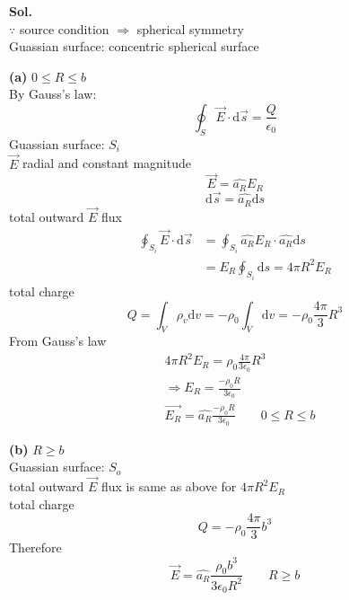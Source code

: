\documentclass[12pt, a4paper]{article}
\begin{document}
\textbf{Sol.} \\
$\because$ source condition $\Rightarrow$ spherical symmetry \\
Guassian surface: concentric spherical surface \\
\newpage

\textbf{(a)} $0 \leq R \leq b$ \\
By Gauss's law:
$$
\oint_S \vec{E} \cdot \text{d} \vec{s} = \frac{Q}{\epsilon_0}
$$
Guassian surface: $S_i$ \\
$\vec{E}$ radial and constant magnitude
$$
\vec{E} = \hat{a_R} E_R
$$
$$
\text{d} \vec{s} = \hat{a_R} \text{d}s
$$
total outward $\vec{E}$ flux
\begin{align*}
	\oint_{S_i} \vec{E}\cdot \text{d} \vec{s} &= \oint_{S_i} \hat{a_R}E_R \cdot \hat{a_R}\text{d}s \\
  &= E_R \oint_{S_i} \text{d}s = 4 \pi R^2 E_R
\end{align*}
total charge
$$
Q = \int_V \rho_v \text{d}v = -\rho_0 \int_V \text{d}v = -\rho_0 \frac{4 \pi}{3} R^3
$$
From Gauss's law
\begin{align*}
	&4 \pi R^2 E_R = \rho_0 \frac{4 \pi}{3 \epsilon_0} R^3 \\
	&\Rightarrow E_R = \frac{-\rho_0R}{3 \epsilon_0} \\
	&\vec{E_R} = \hat{a_R} \frac{-\rho_0R}{3 \epsilon_0} \qquad 0 \leq R \leq b
\end{align*}

\textbf{(b)} $R \geq b$ \\
Guassian surface: $S_o$ \\
total outward $\vec{E}$ flux is same as above for $4 \pi R^2 E_R$ \\
total charge 
$$
Q = -\rho_0 \frac{4 \pi}{3} b^3
$$
Therefore
$$
\vec{E} = \hat{a_R} \frac{\rho_0b^3}{3 \epsilon_0 R^2} \qquad R \geq b
$$
\end{document}
